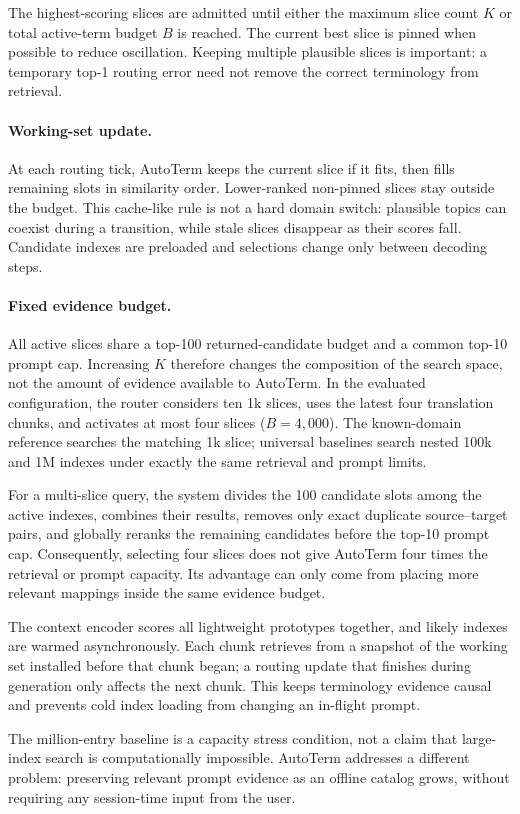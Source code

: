 The highest-scoring slices are admitted until either the maximum slice count
$K$ or total active-term budget $B$ is reached. The current best slice is
pinned when possible to reduce oscillation. Keeping multiple plausible slices
is important: a temporary top-1 routing error need not remove the correct
terminology from retrieval.

\paragraph{Working-set update.}
At each routing tick, AutoTerm keeps the current slice if it fits, then fills
remaining slots in similarity order. Lower-ranked non-pinned slices stay
outside the budget. This cache-like rule is not a hard domain switch: plausible
topics can coexist during a transition, while stale slices disappear as their
scores fall. Candidate indexes are preloaded and selections change only
between decoding steps.

\paragraph{Fixed evidence budget.}
All active slices share a top-100 returned-candidate budget and a common top-10
prompt cap. Increasing $K$ therefore changes the composition of the search
space, not the amount of evidence available to AutoTerm. In the evaluated
configuration, the router considers ten 1k slices, uses the latest four translation chunks,
and activates at most four slices ($B{=}4{,}000$). The known-domain reference
searches the matching 1k slice; universal baselines search nested 100k and 1M
indexes under exactly the same retrieval and prompt limits.

For a multi-slice query, the system divides the 100 candidate slots among the
active indexes, combines their results, removes only exact duplicate
source--target pairs, and globally reranks the remaining candidates before the
top-10 prompt cap. Consequently, selecting four slices does not give AutoTerm
four times the retrieval or prompt capacity. Its advantage can only come from
placing more relevant mappings inside the same evidence budget.

The context encoder scores all lightweight prototypes together, and likely
indexes are warmed asynchronously. Each chunk retrieves from a snapshot of the
working set installed before that chunk began; a routing update that finishes
during generation only affects the next chunk. This keeps terminology evidence
causal and prevents cold index loading from changing an in-flight prompt.

The million-entry baseline is a capacity stress condition, not a claim that
large-index search is computationally impossible. AutoTerm addresses a
different problem: preserving relevant prompt evidence as an offline catalog
grows, without requiring any session-time input from the user.

